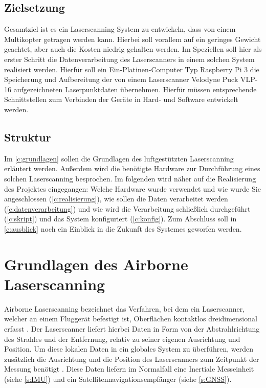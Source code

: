 \documentclass[a4paper,12pt,bibliography=totoc, listof=totoc,titlepage,pointlessnumbers]{scrreprt}
\begin{document}
\section{Zielsetzung}
Gesamtziel ist es ein Laserscanning-System zu entwickeln, dass von einem Multikopter getragen werden kann. Hierbei soll vorallem auf ein geringes Gewicht geachtet, aber auch die Kosten niedrig gehalten werden. Im Speziellen soll hier als erster Schritt die Datenverarbeitung des Laserscanners in einem solchen System realisiert werden. Hierfür soll ein Ein-Platinen-Computer Typ Raspberry Pi 3 die Speicherung und Aufbereitung der von einem Laserscanner Velodyne Puck VLP-16 aufgezeichneten Laserpunktdaten übernehmen. Hierfür müssen entsprechende Schnittstellen zum Verbinden der Geräte in Hard- und Software entwickelt werden.

\section{Struktur}
Im \autoref{c:grundlagen} sollen die Grundlagen des luftgestützten Laserscanning erläutert werden. Außerdem wird die benötigte Hardware zur Durchführung eines solchen Laserscanning besprochen. Im folgenden wird näher auf die Realisierung des Projektes eingegangen: Welche Hardware wurde verwendet und wie wurde Sie angeschlossen (\autoref{c:realisierung}), wie sollen die Daten verarbeitet werden (\autoref{c:datenverarbeitung}) und wie wird die Verarbeitung schließlich durchgeführt (\autoref{c:skript}) und das System konfiguriert (\autoref{c:konfig}). Zum Abschluss soll in \autoref{c:ausblick} noch ein Einblick in die Zukunft des Systemes geworfen werden.

\chapter{Grundlagen des Airborne Laserscanning}
\label{c:grundlagen}

Airborne Laserscanning bezeichnet das Verfahren, bei dem ein Laserscanner, welcher an einem Fluggerät befestigt ist, Oberflächen kontaktlos dreidimensional erfasst \citep[S. 1]{beraldin}. Der Laserscanner liefert hierbei Daten in Form von der Abstrahlrichtung des Strahles und der Entfernung, relativ zu seiner eigenen Ausrichtung und Position. Um diese lokalen Daten in ein globales System zu überführen, werden zusätzlich die Ausrichtung und die Position des Laserscanners zum Zeitpunkt der Messung benötigt \citep[S. 22f]{beraldin}. Diese Daten liefern im Normalfall eine Inertiale Messeinheit (siehe \autoref{s:IMU}) und ein Satellitennavigationsempfänger (siehe \autoref{s:GNSS}).
\end{document}
